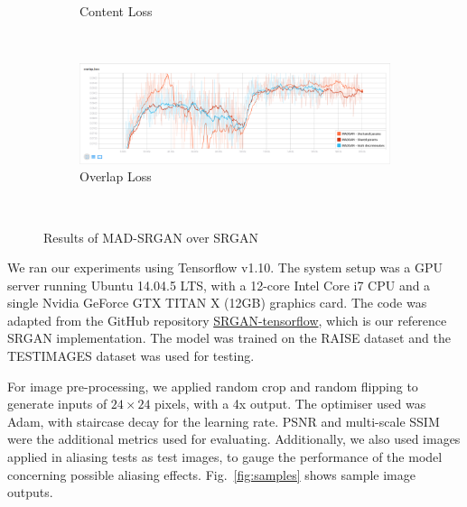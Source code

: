 \documentclass[12pt,a4paper,twocolumn]{article}
\begin{document}
\begin{figure}
\begin{subfigure}{0.48\textwidth}
                \caption{Content Loss}
            \end{subfigure}\\[5mm]
            \begin{subfigure}{0.48\textwidth}
                \includegraphics[width=\textwidth]{images/ovrl-loss.png}
                \caption{Overlap Loss}
            \end{subfigure}\\[2mm]
            \caption{Results of MAD-SRGAN over SRGAN}
            \label{fig:results}
        \end{figure}

        We ran our experiments using Tensorflow \cite{tensorflow} v1.10.
        The system setup was a GPU server running Ubuntu 14.04.5 LTS, with a 12-core Intel Core i7 CPU and a single Nvidia GeForce GTX TITAN X (12GB) graphics card.
        The code was adapted from the GitHub repository \href{https://github.com/brade31919/SRGAN-tensorflow}{SRGAN-tensorflow}, which is our reference SRGAN implementation.
        The model was trained on the RAISE dataset \cite{raise} and the TESTIMAGES dataset \cite{testimages-1,testimages-2} was used for testing.

        For image pre-processing, we applied random crop and random flipping to generate inputs of $24 \times 24$ pixels, with a 4x output.
        The optimiser used was Adam, with staircase decay for the learning rate.
        PSNR and multi-scale SSIM \cite{msssim} were the additional metrics used for evaluating.
        Additionally, we also used images applied in aliasing tests as test images, to gauge the performance of the model concerning possible aliasing effects.
        Fig.~\ref{fig:samples} shows sample image outputs.
\end{document}
